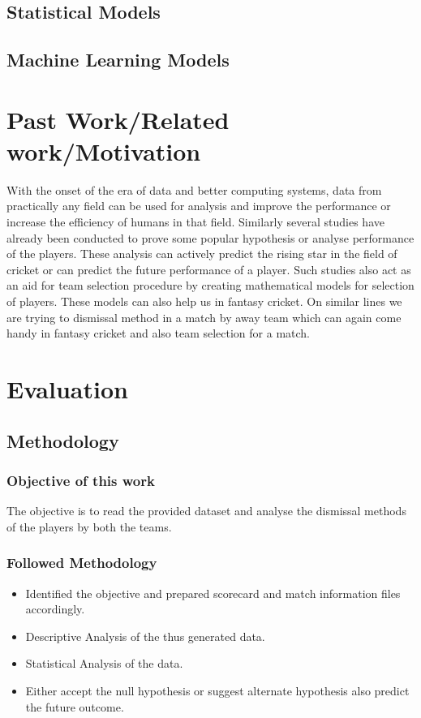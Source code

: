 \documentclass[fleqn,10pt]{wlscirep}
\begin{document}
\subsection{Statistical Models}
\subsection{Machine Learning Models}
\section{Past Work/Related work/Motivation}
With the onset of the era of data and better computing systems, data from practically any field can be used for analysis and 
improve the performance or increase the efficiency of humans in that field. Similarly several studies have already been conducted to prove some popular 
hypothesis or analyse performance of the players. These analysis can actively predict the rising star in the field of cricket or can predict the 
future performance of a player. Such studies also act as an aid for team selection procedure by creating mathematical models for selection of players.
These models can also help us in fantasy cricket.
On similar lines we are trying to dismissal method in a match by away team which can again come handy in fantasy cricket and also team selection for a match.
\section{Evaluation}
\subsection{Methodology}
\subsubsection{Objective of this work}
The objective is to read the provided dataset and analyse the dismissal methods of the players by both the teams.
\subsubsection{Followed Methodology}
\begin{itemize}
    \item Identified the objective and prepared scorecard and match information files accordingly.
    \item Descriptive Analysis of the thus generated data.
    \item Statistical Analysis of the data.
    \item Either accept the null hypothesis or suggest alternate hypothesis also predict the future outcome.
\end{itemize}
\end{document}
